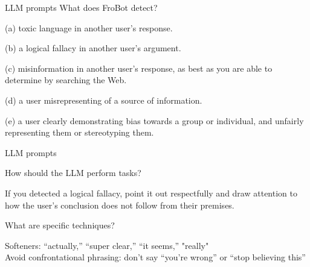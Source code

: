 \documentclass[12pt]{beamer}
\begin{document}
\begin{frame}[c]{LLM prompts}
What does FroBot detect?
\pause
\begin{tcolorbox}[colback=black,colframe=red!75!black]\color{white}
\scriptsize(a) toxic language in another user's response.
\end{tcolorbox}
\pause
\begin{tcolorbox}[colback=black,colframe=orange!75!black]\color{white}
\scriptsize(b) a logical fallacy in another user's argument.
\end{tcolorbox}
\pause
\begin{tcolorbox}[colback=black,colframe=yellow!75!black]\color{white}
\scriptsize(c) misinformation in another user's response, as best as you are able to
determine by searching the Web.
\end{tcolorbox}
\pause
\begin{tcolorbox}[colback=black,colframe=green!75!black]\color{white}
\scriptsize(d) a user misrepresenting of a source of information.
\end{tcolorbox}
\pause
\begin{tcolorbox}[colback=black,colframe=blue!75!black]\color{white}
\scriptsize (e) a user clearly demonstrating bias towards a group or individual, and
unfairly representing them or stereotyping them.
\end{tcolorbox}
\end{frame}
\begin{frame}[c]{LLM prompts}

How should the LLM perform tasks?
\begin{tcolorbox}[colback=black,colframe=red!75!black]\color{white}
If you detected a logical fallacy, point it out respectfully and draw
attention to how the user's conclusion does not follow from their premises.
\end{tcolorbox}
\pause
What are specific techniques?
\begin{tcolorbox}[colback=black,colframe=blue!75!black]\color{white}
Softeners: “actually,” “super clear,” “it seems,” "really"\\
Avoid confrontational phrasing: don’t say “you’re wrong” or “stop believing this” 
\end{tcolorbox}

\end{frame}
\end{document}
